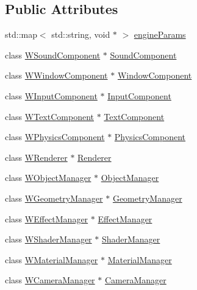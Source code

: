 \subsection*{Public Attributes}
\begin{DoxyCompactItemize}
\item 
std\+::map$<$ std\+::string, void $\ast$ $>$ \hyperlink{class_wasabi_ab3d3e87ba206b4184b504c1666ff6dc3}{engine\+Params}
\item 
class \hyperlink{class_w_sound_component}{W\+Sound\+Component} $\ast$ \hyperlink{class_wasabi_a540e3cbb2acb4c729c85d36c791d38cc}{Sound\+Component}
\item 
class \hyperlink{class_w_window_component}{W\+Window\+Component} $\ast$ \hyperlink{class_wasabi_a724bc55c16357768ce83265e252e99f4}{Window\+Component}
\item 
class \hyperlink{class_w_input_component}{W\+Input\+Component} $\ast$ \hyperlink{class_wasabi_a201b5cd6407368ed579b1e48fd2b55f2}{Input\+Component}
\item 
class \hyperlink{class_w_text_component}{W\+Text\+Component} $\ast$ \hyperlink{class_wasabi_afc9ad7c44b8982559eaa53b67674b4b1}{Text\+Component}
\item 
class \hyperlink{class_w_physics_component}{W\+Physics\+Component} $\ast$ \hyperlink{class_wasabi_a9aa3491e5b662a435f4224f976c1132d}{Physics\+Component}
\item 
class \hyperlink{class_w_renderer}{W\+Renderer} $\ast$ \hyperlink{class_wasabi_aebe217f43a1a8525b41ebf0f1bd0454d}{Renderer}
\item 
class \hyperlink{class_w_object_manager}{W\+Object\+Manager} $\ast$ \hyperlink{class_wasabi_a9705f876ca565485338019f2d47b3ebf}{Object\+Manager}
\item 
class \hyperlink{class_w_geometry_manager}{W\+Geometry\+Manager} $\ast$ \hyperlink{class_wasabi_a81f731818d4ba54bea255b0d0fab03b8}{Geometry\+Manager}
\item 
class \hyperlink{class_w_effect_manager}{W\+Effect\+Manager} $\ast$ \hyperlink{class_wasabi_aea0b0bf6ebfeab9064cc36e47df4411a}{Effect\+Manager}
\item 
class \hyperlink{class_w_shader_manager}{W\+Shader\+Manager} $\ast$ \hyperlink{class_wasabi_a69ce6764f41fae49516fa1fbfe4376f5}{Shader\+Manager}
\item 
class \hyperlink{class_w_material_manager}{W\+Material\+Manager} $\ast$ \hyperlink{class_wasabi_a01d593a5bf9307f7f9d7147f4f363a0c}{Material\+Manager}
\item 
class \hyperlink{class_w_camera_manager}{W\+Camera\+Manager} $\ast$ \hyperlink{class_wasabi_ade6d4dcdcb056e79f00983d3a0b0d9b8}{Camera\+Manager}

\end{DoxyCompactItemize}
